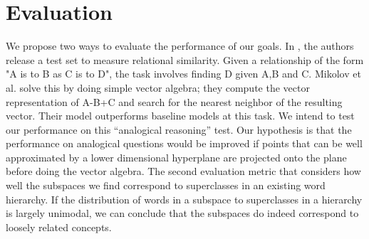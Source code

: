\section{Evaluation}\label{sec:evaluation}

We propose two ways to evaluate the performance of our goals. 
In \cite{mikolov3}, the authors release a test set to measure relational similarity. 
Given a relationship of the form "A is to B as C is to D", the task involves finding D given A,B and C. 
Mikolov et al. 
solve this by doing simple vector algebra; they compute the vector representation of A-B+C and search for the nearest neighbor of the resulting vector. 
Their model outperforms baseline models at this task. 
We intend to test our performance on this “analogical reasoning” test. 
Our hypothesis is that the performance on analogical questions would be improved if points that can be well approximated by a lower dimensional hyperplane are projected onto the plane before doing the vector algebra. 
The second evaluation metric that considers how well the subspaces we find correspond to superclasses in an existing word hierarchy. 
If the distribution of words in a subspace to superclasses in a hierarchy is largely unimodal, we can conclude that the subspaces do indeed correspond to loosely related concepts. 
